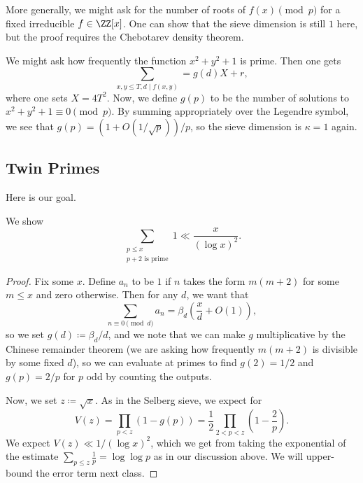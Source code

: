 \documentclass[../notes.tex]{subfiles}
\begin{document}
\begin{remark}
	More generally, we might ask for the number of roots of $f(x)\pmod p$ for a fixed irreducible $f\in\ZZ[x]$. One can show that the sieve dimension is still $1$ here, but the proof requires the Chebotarev density theorem.
\end{remark}
\begin{example}
	We might ask how frequently the function $x^2+y^2+1$ is prime. Then one gets
	\[\sum_{x,y\le T,d\mid f(x,y)}=g(d)X+r,\]
	where one sets $X=4T^2$. Now, we define $g(p)$ to be the number of solutions to $x^2+y^2+1\equiv0\pmod p$. By summing appropriately over the Legendre symbol, we see that $g(p)=(1+O(1/\sqrt p))/p$, so the sieve dimension is $\kappa=1$ again.
\end{example}

\subsection{Twin Primes}
Here is our goal.
\begin{theorem}
	We show
	\[\sum_{\substack{p\le x\\p+2\text{ is prime}}}1\ll\frac x{(\log x)^2}.\]
\end{theorem}
\begin{proof}
	Fix some $x$. Define $a_n$ to be $1$ if $n$ takes the form $m(m+2)$ for some $m\le x$ and zero otherwise. Then for any $d$, we want that
	\[\sum_{n\equiv0\pmod d}a_n=\beta_d\left(\frac xd+O(1)\right),\]
	so we set $g(d)\coloneqq\beta_d/d$, and we note that we can make $g$ multiplicative by the Chinese remainder theorem (we are asking how frequently $m(m+2)$ is divisible by some fixed $d$), so we can evaluate at primes to find $g(2)=1/2$ and $g(p)=2/p$ for $p$ odd by counting the outputs.

	Now, we set $z\coloneqq\sqrt x$. As in the Selberg sieve, we expect for
	\[V(z)=\prod_{p<z}(1-g(p))=\frac12\prod_{2<p<z}\left(1-\frac2p\right).\]
	We expect $V(z)\ll1/(\log x)^2$, which we get from taking the exponential of the estimate $\sum_{p\le z}\frac1p=\log\log p$ as in our discussion above. We will upper-bound the error term next class.
\end{proof}
\end{document}
